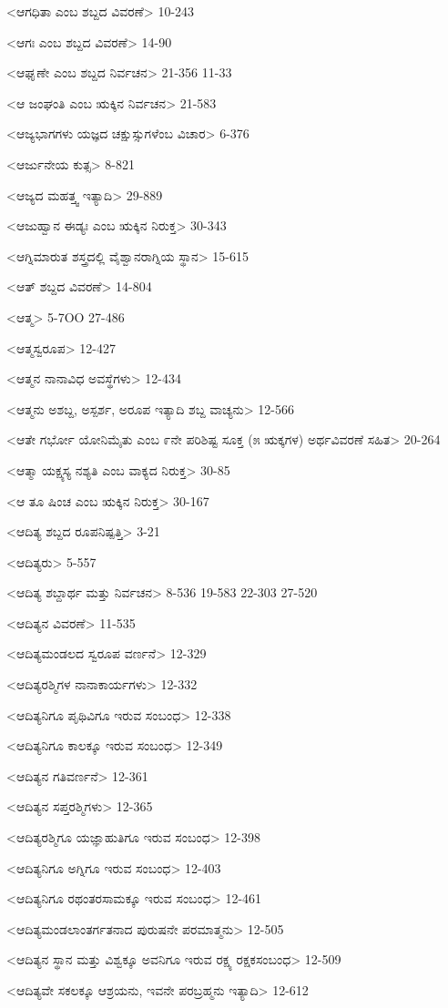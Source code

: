 <ಆಗಧಿತಾ ಎಂಬ ಶಬ್ದದ ವಿವರಣೆ>
10-243

<ಆಗಃ ಎಂಬ ಶಬ್ದದ ವಿವರಣೆ>
14-90

<ಆಘೃಣೇ ಎಂಬ ಶಬ್ದದ ನಿರ್ವಚನ>
21-356 
11-33

<ಆ ಜಂಘಂತಿ ಎಂಬ ಋಕ್ಕಿನ ನಿರ್ವಚನ>
21-583

<ಆಜ್ಯಭಾಗಗಳು ಯಜ್ಞದ ಚಕ್ಷುಸ್ಸುಗಳೆಂಬ ವಿಚಾರ>
6-376

<ಆರ್ಜುನೇಯ ಕುತ್ಸ>
8-821

<ಆಜ್ಯದ ಮಹತ್ತ್ವ ಇತ್ಯಾದಿ>
29-889

<ಆಜುಹ್ವಾನ ಈಡ್ಯಃ ಎಂಬ ಋಕ್ಕಿನ ನಿರುಕ್ತ>
30-343

<ಆಗ್ನಿಮಾರುತ ಶಸ್ತ್ರದಲ್ಲಿ ವೈಶ್ವಾನರಾಗ್ನಿಯ ಸ್ಥಾನ>
15-615

<ಆತ್‍ ಶಬ್ದದ ವಿವರಣೆ>
14-804

<ಆತ್ಮ>
5-7OO
27-486

<ಆತ್ಮಸ್ವರೂಪ>
12-427

<ಆತ್ಮನ ನಾನಾವಿಧ ಅವಸ್ಥೆಗಳು>
12-434

<ಆತ್ಮನು ಅಶಬ್ದ, ಅಸ್ಪರ್ಶ, ಅರೂಪ ಇತ್ಯಾದಿ ಶಬ್ದ ವಾಚ್ಯನು>
12-566

<ಆತೇ ಗರ್ಭೋ ಯೋನಿಮೈತು ಎಂಬ ೯ನೇ ಪರಿಶಿಷ್ಟ ಸೂಕ್ತ (೫ ಋಕ್ಕಗಳ) ಅರ್ಥವಿವರಣೆ ಸಹಿತ>
20-264

<ಆತ್ಮಾ ಯಕ್ಷ್ಯಸ್ಯ ನಶ್ಯತಿ ಎಂಬ ವಾಕ್ಯದ ನಿರುಕ್ತ>
30-85

<ಆ ತೂ ಷಿಂಚ ಎಂಬ ಋಕ್ಕಿನ ನಿರುಕ್ತ>
30-167

<ಆದಿತ್ಯ ಶಬ್ದದ ರೂಪನಿಷ್ಪತ್ತಿ>
3-21

<ಆದಿತ್ಯರು>
5-557

<ಆದಿತ್ಯ ಶಬ್ದಾರ್ಥ ಮತ್ತು ನಿರ್ವಚನ>
8-536 
19-583 
22-303
27-520

<ಆದಿತ್ಯನ ವಿವರಣೆ>
11-535

<ಆದಿತ್ಯಮಂಡಲದ ಸ್ವರೂಪ ವರ್ಣನೆ>
12-329

<ಆದಿತ್ಯರಶ್ಮಿಗಳ ನಾನಾಕಾರ್ಯಗಳು>
12-332

<ಆದಿತ್ಯನಿಗೂ ಪೃಥಿವಿಗೂ ಇರುವ ಸಂಬಂಧ>
12-338

<ಆದಿತ್ಯನಿಗೂ ಕಾಲಕ್ಕೂ ಇರುವ ಸಂಬಂಧ>
12-349

<ಆದಿತ್ಯನ ಗತಿವರ್ಣನೆ>
12-361

<ಆದಿತ್ಯನ ಸಪ್ತರಶ್ಮಿಗಳು>
12-365

<ಆದಿತ್ಯರಶ್ಮಿಗೂ ಯಜ್ಞಾಹುತಿಗೂ ಇರುವ ಸಂಬಂಧ>
12-398

<ಆದಿತ್ಯನಿಗೂ ಅಗ್ನಿಗೂ ಇರುವ ಸಂಬಂಧ>
12-403

<ಆದಿತ್ಯನಿಗೂ ರಥಂತರಸಾಮಕ್ಕೂ ಇರುವ ಸಂಬಂಧ>
12-461

<ಆದಿತ್ಯಮಂಡಲಾಂತರ್ಗತನಾದ ಪುರುಷನೇ ಪರಮಾತ್ಮನು>
12-505

<ಆದಿತ್ಯನ ಸ್ಥಾನ ಮತ್ತು ವಿಶ್ವಕ್ಕೂ ಅವನಿಗೂ ಇರುವ ರಕ್ಷ್ಯ ರಕ್ಷಕಸಂಬಂಧ>
12-509

<ಆದಿತ್ಯವೇ ಸಕಲಕ್ಕೂ ಆಶ್ರಯನು, ಇವನೇ ಪರಬ್ರಹ್ಮನು ಇತ್ಯಾದಿ>
12-612

